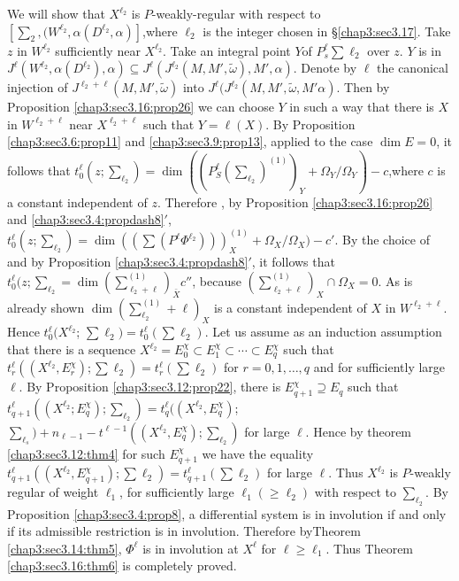 We will show that $X^{\ell_2}$ is $P$-weakly-regular with respect
to\break 
$\left[\sum_2,(W^{\ell_2},\alpha (D^{\ell_2}, \alpha)\right]$,where
$\ell_2$ is the integer chosen in \S  \ref{chap3:sec3.17}. Take $z$ in $W^{\ell_2}$
sufficiently near $X^{\ell_2}$. Take an integral point $Y$\pageoriginale of
$P_s^{\ell} \sum\ell_2$ over $z$. $Y$ is in $J^\ell(W^{\ell_2} ,\alpha
(D^{\ell_2}),\alpha) \subseteq J^\ell (J^{\ell_2}
(M,M',\tilde{\omega}),M',\alpha)$. Denote by $\ell$ the canonical
injection of $J^{\ell_2+\ell}(M,M',\tilde{\omega})$ into
$J^\ell(J^{\ell_2 } (M,M',\tilde{\omega},M'\alpha)$. \break Then by Proposition
\ref{chap3:sec3.16:prop26} we can choose $Y$ in such a way that there is $X$ in $W^{\ell_2
  +\ell}$ near $X^{\ell_2+\ell}$ such that $Y=\ell(X)$. By Proposition
\ref{chap3:sec3.6:prop11} and \ref{chap3:sec3.9:prop13}, applied to the case $\dim E=0$, it follows that
$t^{\ell}_0 (z;\sum_{\ell_2}) =\dim ((P^{\ell}_S (\sum_{\ell_2})
^{(1)})_Y + \Omega _Y / \Omega _Y )-c$,where $c$ is a constant
independent of $z$. Therefore , by Proposition
\ref{chap3:sec3.16:prop26} and \ref{chap3:sec3.4:propdash8}$'$, $t_0  ^\ell 
(z; \sum_{\ell_2})=\dim ((\sum (P^\ell \Phi ^{\ell_2})))^{(1)}_X +
\Omega _X / \Omega_X) -c'$. By the choice of and by Proposition
\ref{chap3:sec3.4:propdash8}$'$,
it follows that $t_0^\ell(z; \sum_{\ell_2} = \dim
(\sum^{(1)}_{\ell_2+\ell})_{\bar{X}} c''$, because
$(\sum^{(1)}_{\ell_2+\ell})_X \cap \Omega_X =0$. As is already shown
$\dim (\sum^{(1)}_{\ell_2}+\ell)_X$ is a constant independent of $X$
in $W^{\ell_2 + \ell}$. Hence $t^\ell_0 (X^{\ell_2}$; 
$\sum\ell_2)=t^\ell_0 (\sum\ell_2)$. Let us assume as an induction
assumption that there is a sequence $X^{\ell_2} = E^{\chi}_0 \subset
E^\chi _1 \subset \cdots \subset E^\chi_q$ such that $t^{\ell}_r ((
X^{\ell_2}, E^\chi_r) ; \sum\ell_2)= t^\ell_r (\sum\ell_2)$ for
$r=0,1, \ldots ,q$ and for sufficiently large $\ell$. By Proposition
\ref{chap3:sec3.12:prop22}, there is $E^\chi_{q+1} \supseteq E_q$ such that
$t^{\ell}_{q+1}((X^{\ell_2}; E^\chi _q); \sum_{\ell_2}) = t^\ell_q
((X^{\ell_2} , E^\chi _q )$; $\sum_{\ell_s}) + n_{\ell-1} - t^{\ell-1}
((X^{\ell_2}, E^\chi_q); \sum_{\ell_2})$ for large $\ell$. Hence by
theorem \ref{chap3:sec3.12:thm4} for such $E^\chi_{q+1}$ we have the equality  $t^{\ell}_{q+1}
((X^{\ell_2}, E^\chi_{q+1}); \sum\ell_2) = t^{\ell}_{q+1}
(\sum\ell_2)$ 
for large $\ell$. Thus $X^{\ell_2}$ is $P$-weakly regular of weight
$\ell_1$, for sufficiently large $\ell_1 (\geq \ell_2)$ with respect to
$\sum_{\ell_2}$. By Proposition \ref{chap3:sec3.4:prop8}, a differential system is in
involution if and only if its admissible restriction is in
involution. Therefore by\pageoriginale Theorem \ref{chap3:sec3.14:thm5}, $\Phi^\ell$ is in involution at
$X^\ell$ for $\ell\geq \ell_1$. Thus Theorem \ref{chap3:sec3.16:thm6} is completely
proved. 
 
